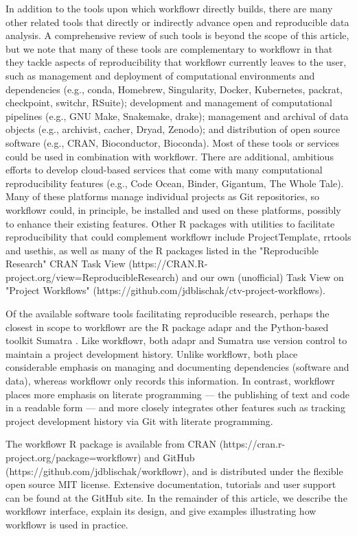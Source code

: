 \documentclass[9pt,a4paper]{extarticle}
\begin{document}
In addition to the tools upon which workflowr directly builds, there are
many other related tools that directly or indirectly advance open and
reproducible data analysis. A comprehensive review of such tools is
beyond the scope of this article, but we note that many of these tools
are complementary to workflowr in that they tackle aspects of
reproducibility that workflowr currently leaves to the user, such as
management and deployment of computational environments and dependencies
(e.g., conda, Homebrew, Singularity, Docker, Kubernetes, packrat,
checkpoint, switchr, RSuite); development and management of
computational pipelines (e.g., GNU Make, Snakemake, drake); management
and archival of data objects (e.g., archivist, cacher, Dryad, Zenodo);
and distribution of open source software (e.g., CRAN, Bioconductor,
Bioconda). Most of these tools or services could be used in combination
with workflowr. There are additional, ambitious efforts to develop
cloud-based services that come with many computational reproducibility
features (e.g., Code Ocean, Binder, Gigantum, The Whole Tale). Many of
these platforms manage individual projects as Git repositories, so
workflowr could, in principle, be installed and used on these platforms,
possibly to enhance their existing features. Other R packages with
utilities to facilitate reproducibility that could complement workflowr
include ProjectTemplate, rrtools and usethis, as well as many of the R
packages listed in the "Reproducible Research" CRAN Task View
(https://CRAN.R-project.org/view=ReproducibleResearch) and our own
(unofficial) Task View on "Project Workflows"
(https://github.com/jdblischak/ctv-project-workflows).

Of the available software tools facilitating reproducible research,
perhaps the closest in scope to workflowr are the R package adapr
\cite{Gelfond2018} and the Python-based toolkit Sumatra
\cite{Davidson2014}. Like workflowr, both adapr and Sumatra use version
control to maintain a project development history. Unlike workflowr,
both place considerable emphasis on managing and documenting
dependencies (software and data), whereas workflowr only records this
information. In contrast, workflowr places more emphasis on literate
programming --- the publishing of text and code in a readable form ---
and more closely integrates other features such as tracking project
development history via Git with literate programming.

The workflowr R package is available from CRAN
(https://cran.r-project.org/package=workflowr) and GitHub
(https://github.com/jdblischak/workflowr), and is distributed under the
flexible open source MIT license. Extensive documentation, tutorials and
user support can be found at the GitHub site. In the remainder of this
article, we describe the workflowr interface, explain its design, and
give examples illustrating how workflowr is used in practice.
\end{document}
